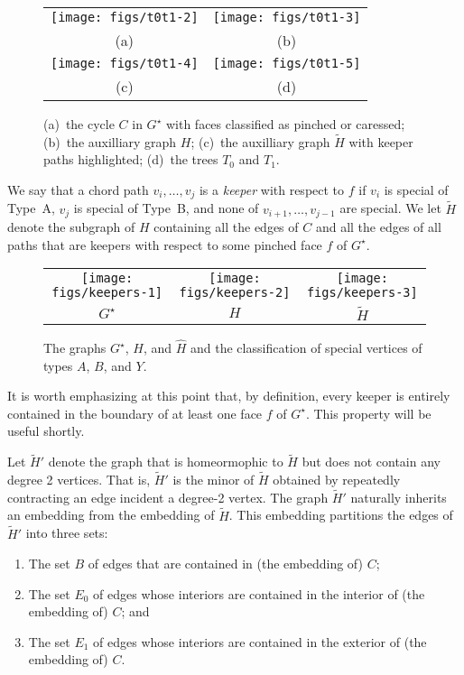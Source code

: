 \documentclass{patmorin}
\newcommand{\dual}[1]{{#1}^\star}
\begin{document}
  \begin{figure}
     \begin{center}\begin{tabular}{cc}
		\texttt{[image: figs/t0t1-2]} &
		\texttt{[image: figs/t0t1-3]} \\
                (a) & (b) \\[1em]
		\texttt{[image: figs/t0t1-4]} &
		\texttt{[image: figs/t0t1-5]} \\
                (c) & (d)
     \end{tabular}\end{center}
	  \caption{(a)~the cycle $C$ in $\dual{G}$ with faces classified as pinched or caressed; (b)~the auxilliary graph $H$; (c)~the auxilliary graph $\tilde{H}$ with keeper paths highlighted; (d)~the trees $T_0$ and $T_1$.}
  \end{figure}

We say that a chord path $v_i,\ldots,v_j$ is a \emph{keeper} with respect to $f$ if $v_i$ is special of Type~A, $v_j$ is special of Type~B, and none of $v_{i+1},\ldots,v_{j-1}$ are special.  We let $\tilde{H}$ denote the subgraph of $H$ containing all the edges of $C$ and all the edges of all paths that are keepers with respect to some pinched face $f$ of $\dual{G}$.

\begin{figure}
   \begin{center}\begin{tabular}{ccc}
        \texttt{[image: figs/keepers-1]} &
        \texttt{[image: figs/keepers-2]} &
        \texttt{[image: figs/keepers-3]} \\
        $\dual{G}$ & $H$ & $\tilde{H}$
   \end{tabular}\end{center}
    \caption{The graphs $\dual{G}$, $H$, and $\hat{H}$ and the classification of special vertices of types $A$, $B$, and $Y$.}
\end{figure}

It is worth emphasizing at this point that, by definition, every keeper is
entirely contained in the boundary of at least one face $f$ of $\dual{G}$.
This property will be useful shortly.

Let $\tilde{H}'$ denote the graph that is homeormophic to $\tilde{H}$
but does not contain any degree 2 vertices.  That is, $\tilde{H}'$
is the minor of $\tilde{H}$ obtained by repeatedly contracting an edge
incident a degree-2 vertex.  The graph $\tilde{H}'$ naturally inherits an
embedding from the embedding of $\tilde{H}$.  This embedding partitions
the edges of $\tilde{H}'$ into three sets:
\begin{enumerate}
  \item The set $B$ of edges that are contained in (the embedding of) $C$;
  \item The set $E_0$ of edges whose interiors are contained in the
  interior of (the embedding of) $C$; and
  \item The set $E_1$ of edges whose interiors are contained in the
  exterior of (the embedding of) $C$.
\end{enumerate}
\end{document}
